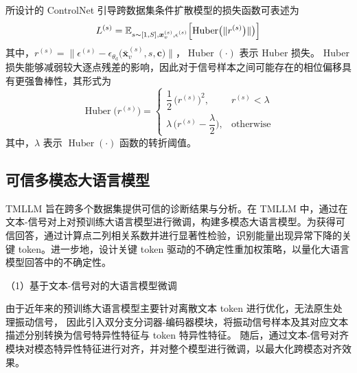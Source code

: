 所设计的 ControlNet 引导跨数据集条件扩散模型的损失函数可表述为
% 
\begin{equation}
	L^{(s)}=\mathbb{E}_{\substack{s\sim[1,S],\bm{x}_v^{(s)},\epsilon^{(s)}}}
	\Bigl[\operatorname{Huber}\bigl(\lVert r^{(s)} \bigr)\rVert\bigr)\Bigr]
\end{equation}
% 
其中，$r^{(s)} = \bigl\lVert\epsilon^{(s)} - \epsilon_{{\theta}_\mathrm{d}}\!\bigl(\bar{\bm{x}}_{v}^{(s)},s,\bm{c}\bigr)\bigr\rVert$，$\operatorname{Huber}(\cdot)$ 表示 Huber 损失。
Huber 损失能够减弱较大逐点残差的影响，因此对于信号样本之间可能存在的相位偏移具有更强鲁棒性，其形式为
% 
\begin{equation}
	\operatorname{Huber}\bigl(r^{(s)}\bigr)=
	\begin{cases}
		\dfrac{1}{2}\, \bigl(r^{(s)}\bigr)^{2},          & r^{(s)} < \lambda \\[4pt]
		\lambda\,\bigl(r^{(s)}-\dfrac{\lambda}{2}\bigr),   & \text{otherwise}
	\end{cases}
	\label{eq:huber}
\end{equation}
其中，$\lambda$ 表示 $\operatorname{Huber}(\cdot)$ 函数的转折阈值。

\subsection{可信多模态大语言模型}\label{subsec:DA-TMLLM_TMLLM}

TMLLM 旨在跨多个数据集提供可信的诊断结果与分析。在 TMLLM 中，通过在文本-信号对上对预训练大语言模型进行微调，构建多模态大语言模型。为获得可信回答，通过计算点二列相关系数并进行显著性检验，识别能量出现异常下降的关键 token。进一步地，设计关键 token 驱动的不确定性重加权策略，以量化大语言模型回答中的不确定性。

（1）基于文本-信号对的大语言模型微调

由于近年来的预训练大语言模型主要针对离散文本 token 进行优化，无法原生处理振动信号，
因此引入双分支分词器-编码器模块，将振动信号样本及其对应文本描述分别转换为信号特异性特征与 token 特异性特征。
随后，通过文本-信号对齐模块对模态特异性特征进行对齐，并对整个模型进行微调，以最大化跨模态对齐效果。

